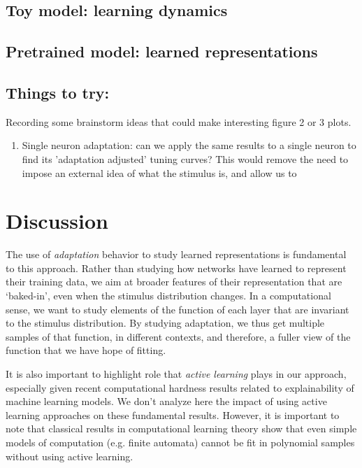 \documentclass[10pt, twocolumn]{article}      %
\begin{document}
\subsection{Toy model: learning dynamics}


\subsection{Pretrained model: learned representations}



\subsection{Things to try:}
Recording some brainstorm ideas that could make interesting figure 2 or 3 plots.
\begin{enumerate}
  \item Single neuron adaptation: can we apply the same results to a single neuron to find its 'adaptation adjusted' tuning curves? This would remove the need to impose an external idea of what the stimulus is, and allow us to
\end{enumerate}




\section{Discussion}


The use of \textit{adaptation} behavior to study learned representations is fundamental to this approach.
Rather than studying how networks have learned to represent their training data, we aim at broader features of their representation that are `baked-in', even when the stimulus distribution changes.
In a computational sense, we want to study elements of the function of each layer that are invariant to the stimulus distribution.
By studying adaptation, we thus get multiple samples of that function, in different contexts, and therefore, a fuller view of the function that we have hope of fitting.

It is also important to highlight role that \textit{active learning} plays in our approach, especially given recent computational hardness results \cite{goldwasser_planting_2022} related to explainability of machine learning models.
We don't analyze here the impact of using active learning approaches on these fundamental results.
However, it is important to note that classical results in computational learning theory \cite{kearns1994introduction} show that even simple models of computation (e.g. finite automata) cannot be fit in polynomial samples without using active learning.
\end{document}
